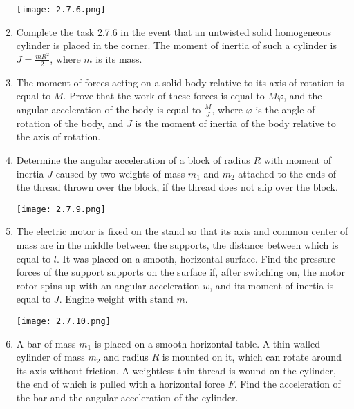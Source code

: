 \documentclass{article}
\begin{document}
\begin{enumerate}[label=2.7.\arabic*]
\begin{center}
    \texttt{[image: 2.7.6.png]}
\end{center}

\item Complete the task 2.7.6 in the event that an untwisted solid homogeneous cylinder is placed in the corner. The moment of inertia of such a cylinder is $J = \frac{m R^2}{2}$, where $m$ is its mass.

\item The moment of forces acting on a solid body relative to its axis of rotation is equal to $M$. Prove that the work of these forces is equal to $M\varphi$, and the angular acceleration of the body is equal to $\frac{M}{J}$, where $\varphi$ is the angle of rotation of the body, and $J$ is the moment of inertia of the body relative to the axis of rotation.

\item Determine the angular acceleration of a block of radius $R$ with moment of inertia $J$ caused by two weights of mass $m_1$ and $m_2$ attached to the ends of the thread thrown over the block, if the thread does not slip over the block.

\begin{center}
    \texttt{[image: 2.7.9.png]}
\end{center}

\item The electric motor is fixed on the stand so that its axis and common center of mass are in the middle between the supports, the distance between which is equal to $l$. It was placed on a smooth, horizontal surface. Find the pressure forces of the support supports on the surface if, after switching on, the motor rotor spins up with an angular acceleration $w$, and its moment of inertia is equal to $J$. Engine weight with stand $m$.

\begin{center}
    \texttt{[image: 2.7.10.png]}
\end{center}

\item A bar of mass $m_1$ is placed on a smooth horizontal table. A thin-walled cylinder of mass $m_2$ and radius $R$ is mounted on it, which can rotate around its axis without friction. A weightless thin thread is wound on the cylinder, the end of which is pulled with a horizontal force $F$. Find the acceleration of the bar and the angular acceleration of the cylinder.


\end{enumerate}
\end{document}
